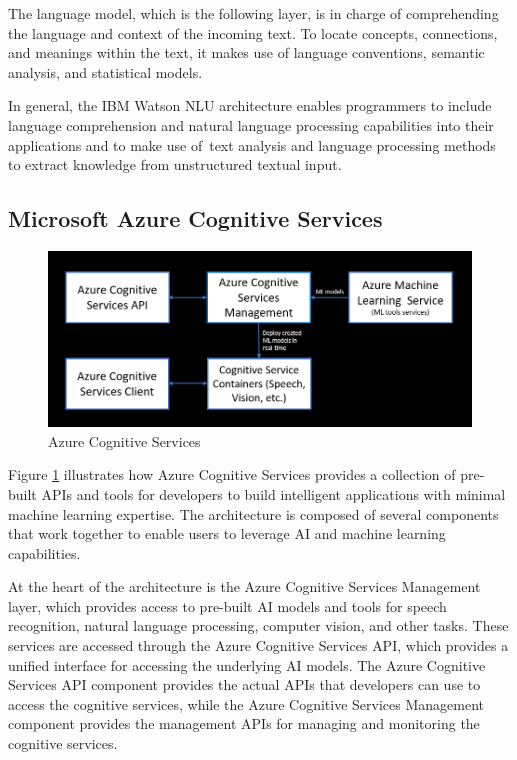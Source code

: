 The language model, which is the following layer, is in charge of comprehending the language and context of the incoming text. To locate concepts, connections, and meanings within the text, it makes use of language conventions, semantic analysis, and statistical models.

In general, the IBM Watson \acs{NLU} architecture enables programmers to include language comprehension and natural language processing capabilities into their applications and to make use of text analysis and language processing methods to extract knowledge from unstructured textual input.

\subsection{Microsoft Azure Cognitive Services}

\begin {figure}[ht]
\centering
\includegraphics[scale=0.696]{images/Chapter2/Azure_arch.png}
\caption{Azure Cognitive Services}
\label{Azure_arch}
\end {figure}

Figure \ref{Azure_arch} illustrates how Azure Cognitive Services provides a collection of pre-built \acs{API}s and tools for developers to build intelligent applications with minimal machine learning expertise. The architecture is composed of several components that work together to enable users to leverage \acs{AI} and machine learning capabilities.

At the heart of the architecture is the Azure Cognitive Services Management layer, which provides access to pre-built \acs{AI} models and tools for speech recognition, natural language processing, computer vision, and other tasks. These services are accessed through the Azure Cognitive Services \acs{API}, which provides a unified interface for accessing the underlying \acs{AI} models. The Azure Cognitive Services \acs{API}  component provides the actual \acs{API}s that developers can use to access the cognitive services, while the Azure Cognitive Services Management component provides the management \acs{API}s for managing and monitoring the cognitive services.

